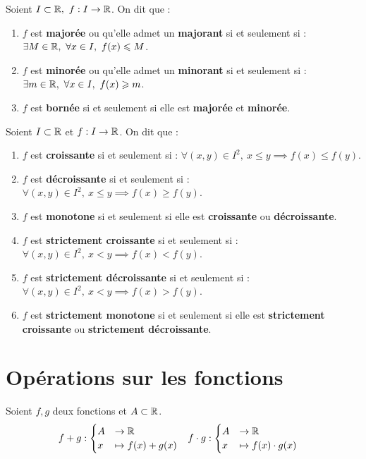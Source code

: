 \begin{definition}
	Soient $I \subset \mathbb{R},\ f : I \to \mathbb{R}$. On dit que :
	\begin{enumerate}
	    \item $f$ est \textbf{majorée} ou qu'elle admet un \textbf{majorant} si et seulement si : $\exists M \in \mathbb{R},\ \forall x \in I,\ f(x) \leqslant M$.
        \item $f$ est \textbf{minorée} ou qu'elle admet un \textbf{minorant} si et seulement si : $\exists m \in \mathbb{R},\ \forall x \in I,\ f(x) \geqslant m$.
        \item $f$ est \textbf{bornée} si et seulement si elle est \textbf{majorée} et \textbf{minorée}.
	\end{enumerate}
\end{definition}

\begin{definition}
	Soient $I \subset \mathbb{R}$ et $f : I \to \mathbb{R}$. On dit que :
    \begin{enumerate}
        \item $f$ est \textbf{croissante} si et seulement si : $\forall (x, y) \in I^2,\ x \leq y \implies f(x) \leq f(y)$.
        \item $f$ est \textbf{décroissante} si et seulement si : $\forall (x, y) \in I^2,\ x \leq y \implies f(x) \geq f(y)$.
        \item $f$ est \textbf{monotone} si et seulement si elle est \textbf{croissante} ou \textbf{décroissante}.
        \item $f$ est \textbf{strictement croissante} si et seulement si : $\forall (x, y) \in I^2,\ x < y \implies f(x) < f(y)$.
        \item $f$ est \textbf{strictement décroissante} si et seulement si : $\forall (x, y) \in I^2,\ x < y \implies f(x) > f(y)$.
        \item $f$ est \textbf{strictement monotone} si et seulement si elle est \textbf{strictement croissante} ou \textbf{strictement décroissante}.
    \end{enumerate}
\end{definition}

\section{Opérations sur les fonctions}
\begin{definition}
	Soient $f, g$ deux fonctions et $A \subset \mathbb{R}$.
	\begin{align*}
		&f + g : 
        \begin{cases}
            A &\to \mathbb{R} \\
		        x &\mapsto f(x) + g(x)
        \end{cases}
        &
        &f \cdot g : 
        \begin{cases}
            A &\to \mathbb{R} \\
		            x &\mapsto f(x) \cdot g(x)
        \end{cases}
	\end{align*}
\end{definition}

